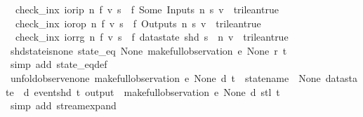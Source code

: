 \begin{isabellebody}
\ \ {\isachardoublequoteopen}check_inx\ ior{\isachardot}ip\ n\ f\ v\ s\ {\isacharequal}\ {\isacharparenleft}f\ {\isacharparenleft}Some\ {\isacharparenleft}Inputs\ {\isacharparenleft}n{\isacharminus}{}{\isacharparenright}\ s{\isacharparenright}{\isacharparenright}\ v\ {\isacharequal}\ trilean{\isachardot}true{\isacharparenright}{\isachardoublequoteclose}\ {\isacharbar}\isanewline
\ \ {\isachardoublequoteopen}check_inx\ ior{\isachardot}op\ n\ f\ v\ s\ {\isacharequal}\ {\isacharparenleft}f\ {\isacharparenleft}Outputs\ n\ s{\isacharparenright}\ v\ {\isacharequal}\ trilean{\isachardot}true{\isacharparenright}{\isachardoublequoteclose}\ {\isacharbar}\isanewline
\ \ {\isachardoublequoteopen}check_inx\ ior{\isachardot}rg\ n\ f\ v\ s\ {\isacharequal}\ {\isacharparenleft}f\ {\isacharparenleft}datastate\ {\isacharparenleft}shd\ s{\isacharparenright}\ {\isachardollar}\ n{\isacharparenright}\ v\ {\isacharequal}\ trilean{\isachardot}true{\isacharparenright}{\isachardoublequoteclose}\isanewline
\isanewline
{}\isamarkupfalse%
\ shd{\isacharunderscore}state{\isacharunderscore}is{\isacharunderscore}none{\isacharcolon}\ {\isachardoublequoteopen}{\isacharparenleft}state_eq\ None{\isacharparenright}\ {\isacharparenleft}make{\isacharunderscore}full{\isacharunderscore}observation\ e\ None\ r\ t{\isacharparenright}{\isachardoublequoteclose}\isanewline
%
\isadelimproof
\ \ %
\endisadelimproof
%
\isatagproof
{}\isamarkupfalse%
\ {\isacharparenleft}simp\ add{\isacharcolon}\ state_eq{\isacharunderscore}def{\isacharparenright}%
\endisatagproof
{\isafoldproof}%
%
\isadelimproof
\isanewline
%
\endisadelimproof
\isanewline
{}\isamarkupfalse%
\ unfold{\isacharunderscore}observe{\isacharunderscore}none{\isacharcolon}\ {\isachardoublequoteopen}make{\isacharunderscore}full{\isacharunderscore}observation\ e\ None\ d\ t\ {\isacharequal}\ {\isacharparenleft}{\isasymlparr}statename\ {\isacharequal}\ None{\isacharcomma}\ datastate\ {\isacharequal}\ d{\isacharcomma}\ event{\isacharequal}{\isacharparenleft}shd\ t{\isacharparenright}{\isacharcomma}\ output\ {\isacharequal}\ {\isacharbrackleft}{\isacharbrackright}{\isasymrparr}{\isacharhash}{\isacharhash}{\isacharparenleft}make{\isacharunderscore}full{\isacharunderscore}observation\ e\ None\ d\ {\isacharparenleft}stl\ t{\isacharparenright}{\isacharparenright}{\isacharparenright}{\isachardoublequoteclose}\isanewline
%
\isadelimproof
\ \ %
\endisadelimproof
%
\isatagproof
{}\isamarkupfalse%
\ {\isacharparenleft}simp\ add{\isacharcolon}\ stream{\isachardot}expand{\isacharparenright}%

\end{isabellebody}
